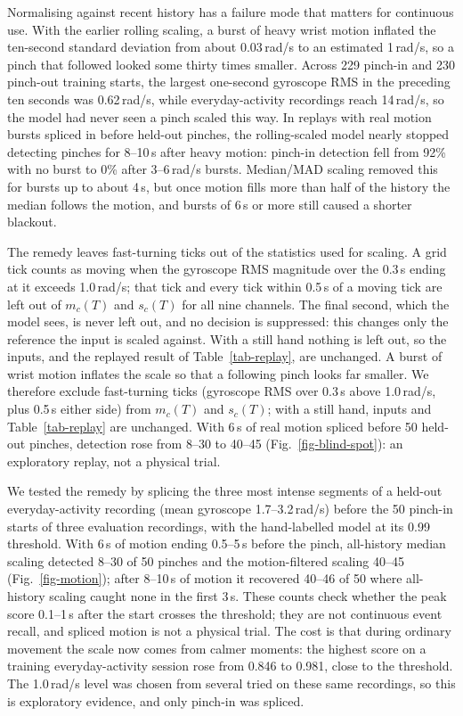 \label{motion-filtered-scaling}

\iffull
Normalising against recent history has a failure mode that matters for continuous use. With the earlier rolling scaling, a burst of heavy wrist motion inflated the ten-second standard deviation from about 0.03\,rad/s to an estimated 1\,rad/s, so a pinch that followed looked some thirty times smaller. Across 229 pinch-in and 230 pinch-out training starts, the largest one-second gyroscope RMS in the preceding ten seconds was 0.62\,rad/s, while everyday-activity recordings reach 14\,rad/s, so the model had never seen a pinch scaled this way. In replays with real motion bursts spliced in before held-out pinches, the rolling-scaled model nearly stopped detecting pinches for 8--10\,s after heavy motion: pinch-in detection fell from 92\% with no burst to 0\% after 3--6\,rad/s bursts. Median/MAD scaling removed this for bursts up to about 4\,s, but once motion fills more than half of the history the median follows the motion, and bursts of 6\,s or more still caused a shorter blackout.

The remedy leaves fast-turning ticks out of the statistics used for scaling. A grid tick counts as moving when the gyroscope RMS magnitude over the 0.3\,s ending at it exceeds 1.0\,rad/s; that tick and every tick within 0.5\,s of a moving tick are left out of \(m_c(T)\) and \(s_c(T)\) for all nine channels. The final second, which the model sees, is never left out, and no decision is suppressed: this changes only the reference the input is scaled against. With a still hand nothing is left out, so the inputs, and the replayed result of Table~\ref{tab-replay}, are unchanged.
\else
A burst of wrist motion inflates the scale so that a following pinch looks far smaller. We therefore exclude fast-turning ticks (gyroscope RMS over 0.3\,s above 1.0\,rad/s, plus 0.5\,s either side) from \(m_c(T)\) and \(s_c(T)\); with a still hand, inputs and Table~\ref{tab-replay} are unchanged. With 6\,s of real motion spliced before 50 held-out pinches, detection rose from 8--30 to 40--45\ifmorefigures{} (Fig.~\ref{fig-blind-spot})\fi: an exploratory replay, not a physical trial.
\fi

\iffull
We tested the remedy by splicing the three most intense segments of a held-out everyday-activity recording (mean gyroscope 1.7--3.2\,rad/s) before the 50 pinch-in starts of three evaluation recordings, with the hand-labelled model at its 0.99 threshold. With 6\,s of motion ending 0.5--5\,s before the pinch, all-history median scaling detected 8--30 of 50 pinches and the motion-filtered scaling 40--45 (Fig.~\ref{fig-motion}); after 8--10\,s of motion it recovered 40--46 of 50 where all-history scaling caught none in the first 3\,s. These counts check whether the peak score 0.1--1\,s after the start crosses the threshold; they are not continuous event recall, and spliced motion is not a physical trial. The cost is that during ordinary movement the scale now comes from calmer moments: the highest score on a training everyday-activity session rose from 0.846 to 0.981, close to the threshold. The 1.0\,rad/s level was chosen from several tried on these same recordings, so this is exploratory evidence, and only pinch-in was spliced.


